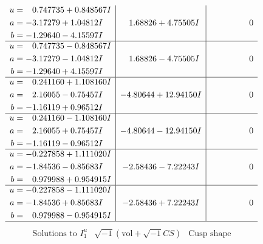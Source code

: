 \documentclass[1p]{elsarticle_modified}
\theoremstyle{definition}
\newcommand{\I}{\sqrt{-1}}
\begin{document}
$$\begin{array}{c|c|c}
\begin{aligned}
u &= \phantom{-}0.747735 + 0.848567 I \\
a &= -3.17279 + 1.04812 I \\
b &= -1.29640 - 4.15597 I\end{aligned}
 & \phantom{-}1.68826 + 4.75505 I & \phantom{-0.000000 } 0 \\ \hline\begin{aligned}
u &= \phantom{-}0.747735 - 0.848567 I \\
a &= -3.17279 - 1.04812 I \\
b &= -1.29640 + 4.15597 I\end{aligned}
 & \phantom{-}1.68826 - 4.75505 I & \phantom{-0.000000 } 0 \\ \hline\begin{aligned}
u &= \phantom{-}0.241160 + 1.108160 I \\
a &= \phantom{-}2.16055 - 0.75457 I \\
b &= -1.16119 + 0.96512 I\end{aligned}
 & -4.80644 + 12.94150 I & \phantom{-0.000000 } 0 \\ \hline\begin{aligned}
u &= \phantom{-}0.241160 - 1.108160 I \\
a &= \phantom{-}2.16055 + 0.75457 I \\
b &= -1.16119 - 0.96512 I\end{aligned}
 & -4.80644 - 12.94150 I & \phantom{-0.000000 } 0 \\ \hline\begin{aligned}
u &= -0.227858 + 1.111020 I \\
a &= -1.84536 - 0.85683 I \\
b &= \phantom{-}0.979988 + 0.954915 I\end{aligned}
 & -2.58436 - 7.22243 I & \phantom{-0.000000 } 0 \\ \hline\begin{aligned}
u &= -0.227858 - 1.111020 I \\
a &= -1.84536 + 0.85683 I \\
b &= \phantom{-}0.979988 - 0.954915 I\end{aligned}
 & -2.58436 + 7.22243 I & \phantom{-0.000000 } 0\\
 \hline 
 \end{array}$$\newpage$$\begin{array}{c|c|c}  
\text{Solutions to }I^u_{1}& \I (\text{vol} + \sqrt{-1}CS) & \text{Cusp shape}\\
 \hline 
\begin{aligned}

\end{aligned}
\end{array}$$
\end{document}
